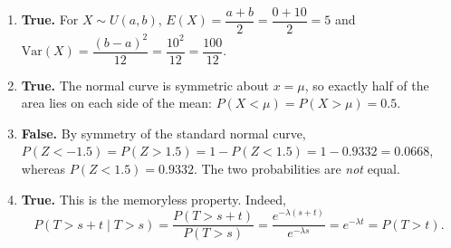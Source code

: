 \documentclass[11pt]{article}
\begin{document}
\begin{corrige}
\begin{enumerate}
\item \textbf{True.} For $X \sim U(a,b)$, $E(X) = \dfrac{a+b}{2} = \dfrac{0+10}{2} = 5$ and $\mathrm{Var}(X) = \dfrac{(b-a)^2}{12} = \dfrac{10^2}{12} = \dfrac{100}{12}$.

\item \textbf{True.} The normal curve is symmetric about $x = \mu$, so exactly half of the area lies on each side of the mean: $P(X < \mu) = P(X > \mu) = 0.5$.

\item \textbf{False.} By symmetry of the standard normal curve, $P(Z < -1.5) = P(Z > 1.5) = 1 - P(Z < 1.5) = 1 - 0.9332 = 0.0668$, whereas $P(Z < 1.5) = 0.9332$. The two probabilities are \emph{not} equal.

\item \textbf{True.} This is the memoryless property. Indeed,
\[
P(T > s+t \mid T > s) = \frac{P(T > s+t)}{P(T > s)} = \frac{e^{-\lambda(s+t)}}{e^{-\lambda s}} = e^{-\lambda t} = P(T > t).
\]
\end{enumerate}
\end{corrige}
\end{document}
